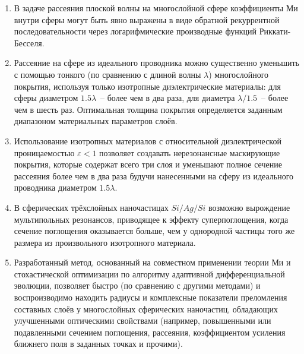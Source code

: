 {}  %
\mynobreakpar\begin{enumerate}
  \item В задаче рассеяния плоской волны на многослойной сфере
    коэффициенты Ми внутри сферы могут быть явно выражены в виде
    обратной рекуррентной последовательности через логарифмические
    производные функций Риккати-Бесселя. %
  \item Рассеяние на сфере из идеального проводника можно существенно
    уменьшить с помощью тонкого (по сравнению с длиной волны
    $\lambda$) многослойного покрытия, используя только изотропные
    диэлектрические материалы: для сферы диаметром $1.5\lambda$~-- более
    чем в два раза, для диаметра $\lambda/1.5$~-- более чем в шесть
    раз. Оптимальная толщина покрытия определяется заданным диапазоном
    материальных параметров слоёв.
  \item 
    Использование изотропных материалов с относительной
    диэлектрической проницаемостью $\varepsilon<1$ позволяет
    создавать нерезонансные маскирующие покрытия, которые содержат
    всего три слоя и уменьшают полное сечение рассеяния более чем в
    два раза будучи нанесенными на сферу из идеального проводника диаметром
    $1.5\lambda$.

  \item В сферических трёхслойных наночастицах $Si/Ag/Si$ возможно
    вырождение мультипольных резонансов, приводящее к эффекту
    суперпоглощения, когда сечение поглощения оказывается больше, чем
    у однородной частицы того же размера из произвольного изотропного
    материала.
  \item Разработанный метод, основанный на совместном применении
    теории Ми и стохастической оптимизации по алгоритму адаптивной
    дифференциальной эволюции, позволяет быстро (по
    сравнению с другими методами) и воспроизводимо находить радиусы и
    комплексные показатели преломления составных слоёв у многослойных
    сферических наночастиц, обладающих улучшенными оптическими
    свойствами (например, повышенными или подавленными сечением
    поглощения, рассеяния, коэффициентом усиления ближнего поля в
    заданных точках и прочими).
\end{enumerate}


